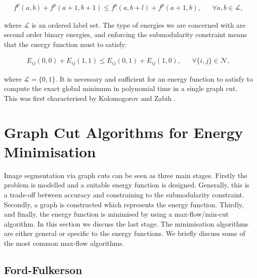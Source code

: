 \begin{align}
&f^p(a,b) + f^p(a+1,b+1) \leq f^p(a,b+l) + f^p(a+1,b),&  &\forall a,b \in \mathcal{L},&
\end{align}

where $\mathcal{L}$ is an ordered label set. The type of energies we are concerned with are second order binary energies, and enforcing the submodularity constraint means that the energy function must to satisfy:

\begin{align}
&E_{ij}(0,0) + E_{ij}(1,1) \leq E_{ij}(0,1) + E_{ij}(1,0),&  &\forall \{i,j\} \in \mathcal{N},&
\label{eq:submodular_energy}
\end{align}

where $\mathcal{L}=\{0,1\}$. It is necessary and sufficient for an energy function to satisfy  to compute the exact global minimum in polynomial time in a single graph cut. This was first characterised by Kolomogorov and Zabih \citep{Kolmogorov2004}.


\section{Graph Cut Algorithms for Energy Minimisation}
\label{sec:MaxFlowMinCutAlgoithms}

Image segmentation via graph cuts can be seen as three main stages. Firstly the problem is modelled and a suitable energy function is designed. Generally, this is a trade-off between accuracy and constraining to the submodularity constraint. Secondly, a graph is constructed which represents the energy function. Thirdly, and finally, the energy function is minimised by using a max-flow/min-cut algorithm. In this section we discuss the last stage. The minimisation algorithms are either general or specific to the energy functions. We briefly discuss some of the most common max-flow algorithms.

\subsection{Ford-Fulkerson}
\label{sec:FordFulkerson}

